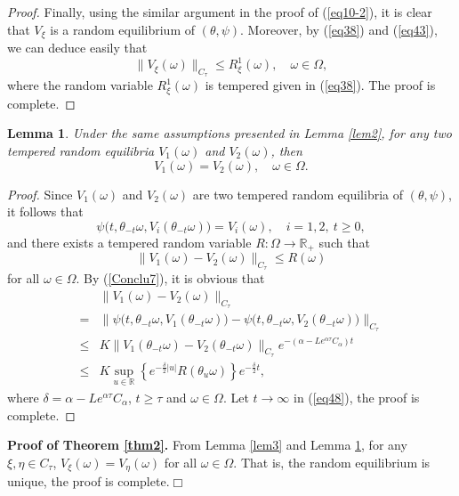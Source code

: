 \documentclass[preprint,12pt]{elsarticle}
\newtheorem{lemma}{Lemma}[section]
\begin{document}
\begin{proof}
Finally, using the similar argument in the proof of (\ref{eq10-2}), it is clear that $V_\xi$ is a random equilibrium of $(\theta,\psi)$. Moreover, by (\ref{eq38}) and (\ref{eq43}), we can deduce easily that
\begin{equation}\label{eq46}
\|V_\xi(\omega)\|_{C_\tau}\leq R_\xi^1(\omega),\quad\omega\in\Omega,
\end{equation}
where the random variable $R_\xi^1(\omega)$ is tempered given in (\ref{eq38}). The proof is complete.
\end{proof}

\begin{lemma}\label{lem4}
Under the same assumptions presented in Lemma \ref{lem2}, for any two tempered random equilibria $V_1(\omega)$ and $V_2(\omega)$, then
\begin{equation}\label{eq47}
V_1(\omega)=V_2(\omega),\quad\omega\in\Omega.
\end{equation}
\end{lemma}
\begin{proof}
Since $V_1(\omega)$ and $V_2(\omega)$ are two tempered random equilibria of $(\theta,\psi)$, it follows that
\[\psi\bigl(t,\theta_{-t}\omega,V_i(\theta_{-t}\omega)\bigr)=V_i(\omega),\quad i=1,2,\ t\geq0,\]
and there exists a tempered random variable $R:\Omega\rightarrow\mathbb{R}_+$ such that
\[\|V_1(\omega)-V_2(\omega)\|_{C_\tau}\leq R(\omega)\]
for all $\omega\in\Omega$. By (\ref{Conclu7}), it is obvious that
\begin{align}\label{eq48}
&\|V_1(\omega)-V_2(\omega)\|_{C_\tau}\nonumber\\
=&\|\psi\bigl(t,\theta_{-t}\omega,V_1(\theta_{-t}\omega)\bigr)-\psi\bigl(t,\theta_{-t}\omega,V_2(\theta_{-t}\omega)\bigr)\|_{C_\tau}\nonumber\\
\leq& K\|V_1(\theta_{-t}\omega)-V_2(\theta_{-t}\omega)\|_{C_\tau}e^{-(\alpha-Le^{\alpha\tau}C_\alpha)t}\nonumber\\
\leq& K\sup_{u\in\mathbb{R}}\left\{e^{-\frac{\delta}{2}|u|}R(\theta_u\omega)\right\}e^{-\frac\delta2t},
\end{align}
where $\delta=\alpha-Le^{\alpha\tau}C_\alpha$, $t\geq\tau$ and $\omega\in\Omega$. Let $t\rightarrow\infty$ in (\ref{eq48}), the proof is complete.
\end{proof}

\noindent
{\bf Proof of Theorem \ref{thm2}.} From Lemma \ref{lem3} and Lemma \ref{lem4}, for any $\xi,\eta\in C_\tau$, $V_\xi(\omega)=V_\eta(\omega)$ for all $\omega\in\Omega$. That is, the random equilibrium is unique, the proof is complete.\quad\quad$\Box$
\end{document}
